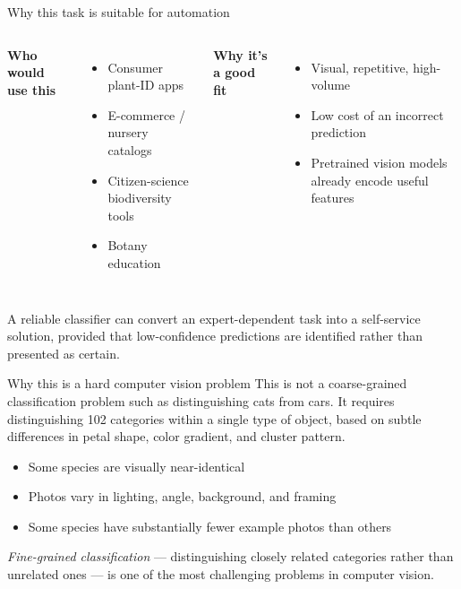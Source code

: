 \documentclass[aspectratio=169]{beamer}
\begin{document}
\begin{frame}{Why this task is suitable for automation}
\begin{columns}[T]
  \textbf{Who would use this}
  \begin{itemize}
    \item Consumer plant-ID apps
    \item E-commerce / nursery catalogs
    \item Citizen-science biodiversity tools
    \item Botany education
  \end{itemize}

  \textbf{Why it's a good fit}
  \begin{itemize}
    \item Visual, repetitive, high-volume
    \item Low cost of an incorrect prediction
    \item Pretrained vision models already encode useful features
  \end{itemize}
\end{columns}

\vspace{1em}
A reliable classifier can convert an expert-dependent task into a
self-service solution, provided that low-confidence predictions are
identified rather than presented as certain.
\end{frame}

\begin{frame}{Why this is a hard computer vision problem}
This is not a coarse-grained classification problem such as distinguishing
cats from cars. It requires distinguishing 102 categories within a single
type of object, based on subtle differences in petal shape, color gradient,
and cluster pattern.

\vspace{1em}
\begin{itemize}
  \item Some species are visually near-identical
  \item Photos vary in lighting, angle, background, and framing
  \item Some species have substantially fewer example photos than others
\end{itemize}

\vspace{1em}
\emph{Fine-grained classification} — distinguishing closely related
categories rather than unrelated ones — is one of the most challenging
problems in computer vision.
\end{frame}
\end{document}
